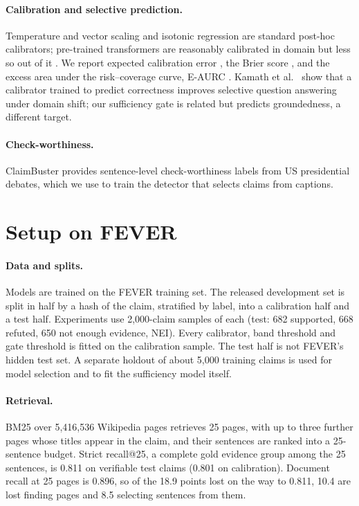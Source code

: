 \documentclass[11pt]{article}
\begin{document}
\paragraph{Calibration and selective prediction.} Temperature and vector scaling \citep{guo2017calibration}
and isotonic regression \citep{zadrozny2002multiclass} are standard post-hoc calibrators; pre-trained
transformers are reasonably calibrated in domain but less so out of it \citep{desai2020calibration}. We
report expected calibration error \citep{naeini2015ece}, the Brier score \citep{brier1950verification},
and the excess area under the risk--coverage curve, E-AURC \citep{geifman2019bias}. Kamath et al.\
\citep{kamath2020selective} show that a calibrator trained to predict correctness improves selective
question answering under domain shift; our sufficiency gate is related but predicts groundedness, a
different target.

\paragraph{Check-worthiness.} ClaimBuster \citep{hassan2017claimbuster, arslan2020benchmark} provides
sentence-level check-worthiness labels from US presidential debates, which we use to train the detector
that selects claims from captions.

\section{Setup on FEVER}
\label{sec:setup}

\paragraph{Data and splits.} Models are trained on the FEVER training set. The released development set is
split in half by a hash of the claim, stratified by label, into a calibration half and a test half.
Experiments use 2,000-claim samples of each (test: 682 supported, 668 refuted, 650 not enough evidence,
NEI). Every calibrator, band threshold and gate threshold is fitted on the calibration sample. The test
half is not FEVER's hidden test set. A separate holdout of about 5,000 training claims is used for model
selection and to fit the sufficiency model itself.

\paragraph{Retrieval.} BM25 \citep{robertson2009bm25} over 5,416,536 Wikipedia pages retrieves 25 pages,
with up to three further pages whose titles appear in the claim, and their sentences are ranked into a
25-sentence budget. Strict recall@25, a complete gold evidence group among the 25 sentences, is 0.811 on
verifiable test claims (0.801 on calibration). Document recall at 25 pages is 0.896, so of the 18.9 points
lost on the way to 0.811, 10.4 are lost finding pages and 8.5 selecting sentences from them.
\end{document}
